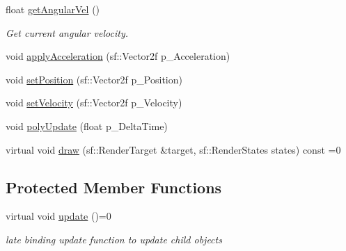 \begin{DoxyCompactItemize}
\mbox{\label{class_kinematic_a477df46feabc6a17eaae68f860b23e07}} 
float \hyperlink{class_kinematic_a477df46feabc6a17eaae68f860b23e07}{get\+Angular\+Vel} ()
\begin{DoxyCompactList}\small\item\em Get current angular velocity. \end{DoxyCompactList}\item 
void \hyperlink{class_kinematic_acca21f5a492ef8cea9aa168e2bd1aada}{apply\+Acceleration} (sf\+::\+Vector2f p\+\_\+\+Acceleration)
\item 
void \hyperlink{class_kinematic_afcf0ed9a3b711fd149cb64cc66711c6c}{set\+Position} (sf\+::\+Vector2f p\+\_\+\+Position)
\item 
void \hyperlink{class_kinematic_ad32a87fafb92696178ec3edf69b4657c}{set\+Velocity} (sf\+::\+Vector2f p\+\_\+\+Velocity)
\item 
void \hyperlink{class_kinematic_aafc7bfadfcbbfe84d58162063f0ae94a}{poly\+Update} (float p\+\_\+\+Delta\+Time)
\item 
virtual void \hyperlink{class_kinematic_a5d403bfe970efc1f0cebc872e3e2898b}{draw} (sf\+::\+Render\+Target \&target, sf\+::\+Render\+States states) const =0
\end{DoxyCompactItemize}
\subsection*{Protected Member Functions}
\begin{DoxyCompactItemize}
\item 
\mbox{\label{class_kinematic_a99f7c1c609633a7bd5970d5a4f7e7c51}} 
virtual void \hyperlink{class_kinematic_a99f7c1c609633a7bd5970d5a4f7e7c51}{update} ()=0
\begin{DoxyCompactList}\small\item\em late binding update function to update child objects \end{DoxyCompactList}\end{DoxyCompactItemize}
